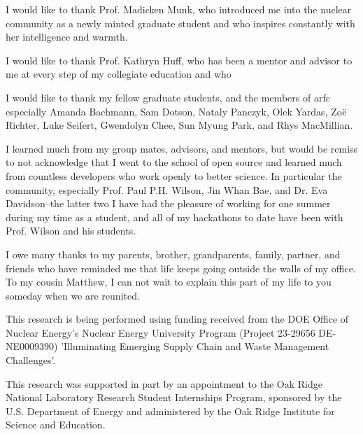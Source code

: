 I would like to thank Prof. Madicken Munk, who introduced me into
the nuclear community as a newly minted graduate student and who inspires
constantly with her intelligence and warmth.

I would like to thank Prof. Kathryn Huff, who has been a mentor and advisor to
me at every step of my collegiate education and who

I would like to thank my fellow graduate students, and the members of
\gls{arfc} especially Amanda Bachmann, Sam Dotson, Nataly Panczyk, Olek Yardas,
Zoë Richter, Luke Seifert, Gwendolyn Chee, Sun Myung Park, and Rhys MacMillian.

I learned much from my group mates, advisors, and mentors, but would be
remiss to not acknowledge that I went to the school of open source and
learned much from countless developers who work openly to better science. In
particular the \cyclus community, especially Prof. Paul P.H. Wilson, Jin Whan
Bae, and Dr. Eva Davidson--the latter two I have had the pleasure of working
for one summer during my time as a student, and all of my hackathons to date
have been with Prof. Wilson and his students.

I owe many thanks to my parents, brother, grandparents, family, partner, and
friends who have reminded me that life keeps going outside the walls of my
office. To my cousin Matthew, I can not wait to explain this part of my life to
you someday when we are reunited.

This research is being performed using funding received from the DOE Office of
Nuclear Energy's Nuclear Energy University Program (Project 23-29656
DE-NE0009390) 'Illuminating Emerging Supply Chain and Waste Management
Challenges'.

This research was supported in part by an appointment to the Oak Ridge National
Laboratory Research Student Internships Program, sponsored by the U.S.
Department of Energy and administered by the Oak Ridge Institute for Science
and Education.